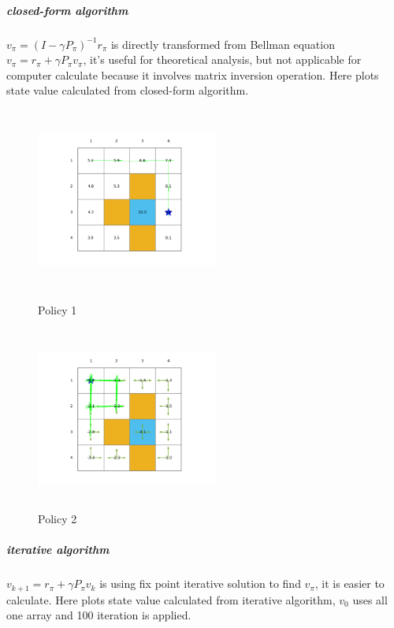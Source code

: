 \documentclass[UTF8]{ctexart}
\begin{document}
	\subparagraph{closed-form algorithm} $v_\pi = (I - \gamma P_\pi)^{-1}r_\pi$ is directly transformed from Bellman equation $v_\pi = r_\pi+\gamma P_\pi v_\pi$, it's useful for theoretical analysis, but not applicable for computer calculate because it involves matrix inversion operation. Here plots state value calculated from closed-form algorithm.
	\begin{figure}[H]
		\centering
		\begin{minipage}[t]{0.48\textwidth}
			\centering
			\includegraphics[width=6cm,height=6cm]{fig/policy1_closed}
			\caption{Policy 1}
		\end{minipage}
		\begin{minipage}[t]{0.48\textwidth}
			\centering
			\includegraphics[width=6cm,height=6cm]{fig/policy2_closed}
			\caption{Policy 2}
		\end{minipage}
	\end{figure}
	\subparagraph{iterative algorithm} $v_{k+1} = r_\pi + \gamma P_\pi v_{k}$ is using fix point iterative solution to find $v_\pi$, it is easier to calculate. Here plots state value calculated from iterative algorithm, $v_0$ uses all one array and 100 iteration is applied.
\end{document}
